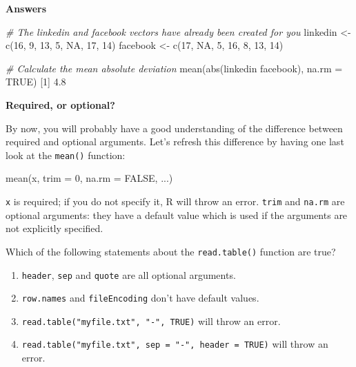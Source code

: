 \documentclass[]{article}
\providecommand{\tightlist}{%
  \setlength{\itemsep}{0pt}\setlength{\parskip}{0pt}}
\newcommand{\hlnum}[1]{\textcolor[rgb]{0.816,0.125,0.439}{#1}}%
\newcommand{\hlstr}[1]{\textcolor[rgb]{0.251,0.627,0.251}{#1}}%
\newcommand{\hlcom}[1]{\textcolor[rgb]{0.502,0.502,0.502}{\textit{#1}}}%
\newcommand{\hlstd}[1]{\textcolor[rgb]{0.251,0.251,0.251}{#1}}%
\newcommand{\hlkwc}[1]{\textcolor[rgb]{0.251,0.251,0.251}{#1}}%
\newcommand{\hlkwd}[1]{\textcolor[rgb]{0.878,0.439,0.125}{#1}}%
\newenvironment{Shaded}{\begin{myshaded}}{\end{myshaded}}
\newcommand{\KeywordTok}[1]{\hlkwd{#1}}
\newcommand{\DataTypeTok}[1]{\hlkwc{#1}}
\newcommand{\DecValTok}[1]{\hlnum{#1}}
\newcommand{\FloatTok}[1]{\hlnum{#1}}
\newcommand{\StringTok}[1]{\hlstr{#1}}
\newcommand{\CommentTok}[1]{\hlcom{#1}}
\newcommand{\OtherTok}[1]{{#1}}
\newcommand{\NormalTok}[1]{\hlstd{#1}}
\begin{document}
\textbf{Answers}

\begin{Shaded}
\begin{Highlighting}[]
\CommentTok{# The linkedin and facebook vectors have already been created for you}
\NormalTok{linkedin <-}\StringTok{ }\KeywordTok{c}\NormalTok{(}\DecValTok{16}\NormalTok{, }\DecValTok{9}\NormalTok{, }\DecValTok{13}\NormalTok{, }\DecValTok{5}\NormalTok{, }\OtherTok{NA}\NormalTok{, }\DecValTok{17}\NormalTok{, }\DecValTok{14}\NormalTok{)}
\NormalTok{facebook <-}\StringTok{ }\KeywordTok{c}\NormalTok{(}\DecValTok{17}\NormalTok{, }\OtherTok{NA}\NormalTok{, }\DecValTok{5}\NormalTok{, }\DecValTok{16}\NormalTok{, }\DecValTok{8}\NormalTok{, }\DecValTok{13}\NormalTok{, }\DecValTok{14}\NormalTok{)}

\CommentTok{# Calculate the mean absolute deviation}
\KeywordTok{mean}\NormalTok{(}\KeywordTok{abs}\NormalTok{(linkedin }\OperatorTok{-}\StringTok{ }\NormalTok{facebook), }\DataTypeTok{na.rm =} \OtherTok{TRUE}\NormalTok{)}
\NormalTok{   [}\DecValTok{1}\NormalTok{] }\FloatTok{4.8}
\end{Highlighting}
\end{Shaded}

\textbf{Required, or optional?}

By now, you will probably have a good understanding of the difference
between required and optional arguments. Let's refresh this difference
by having one last look at the \texttt{mean()} function:

\begin{Shaded}
\begin{Highlighting}[]
\KeywordTok{mean}\NormalTok{(x, }\DataTypeTok{trim =} \DecValTok{0}\NormalTok{, }\DataTypeTok{na.rm =} \OtherTok{FALSE}\NormalTok{, ...)}
\end{Highlighting}
\end{Shaded}

\texttt{x} is required; if you do not specify it, R will throw an error.
\texttt{trim} and \texttt{na.rm} are optional arguments: they have a
default value which is used if the arguments are not explicitly
specified.

Which of the following statements about the \texttt{read.table()}
function are true?

\begin{enumerate}
\def\labelenumi{\arabic{enumi}.}
\tightlist
\item
  \texttt{header}, \texttt{sep} and \texttt{quote} are all optional
  arguments.
\item
  \texttt{row.names} and \texttt{fileEncoding} don't have default
  values.
\item
  \texttt{read.table("myfile.txt",\ "-",\ TRUE)} will throw an error.
\item
  \texttt{read.table("myfile.txt",\ sep\ =\ "-",\ header\ =\ TRUE)} will
  throw an error.
\end{enumerate}
\end{document}
